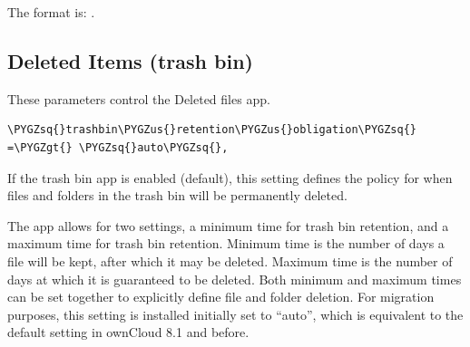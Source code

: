 \documentclass[letterpaper,10pt,english]{sphinxmanual}
\def\PYGZus{\char`\_}
\def\PYGZgt{\char`\>}
\def\PYGZsq{\char`\'}
\renewcommand\PYGZsq{\textquotesingle}
\begin{document}
The format is: .


\subsection{Deleted Items (trash bin)}
\label{configuration_server/config_sample_php_parameters:deleted-items-trash-bin}
These parameters control the Deleted files app.

\begin{Verbatim}[commandchars=\\\{\}]
\PYGZsq{}trashbin\PYGZus{}retention\PYGZus{}obligation\PYGZsq{} =\PYGZgt{} \PYGZsq{}auto\PYGZsq{},
\end{Verbatim}

If the trash bin app is enabled (default), this setting defines the policy
for when files and folders in the trash bin will be permanently deleted.

The app allows for two settings, a minimum time for trash bin retention,
and a maximum time for trash bin retention.
Minimum time is the number of days a file will be kept, after which it
may be deleted. Maximum time is the number of days at which it is guaranteed
to be deleted.
Both minimum and maximum times can be set together to explicitly define
file and folder deletion. For migration purposes, this setting is installed
initially set to ``auto'', which is equivalent to the default setting in
ownCloud 8.1 and before.
\end{document}
